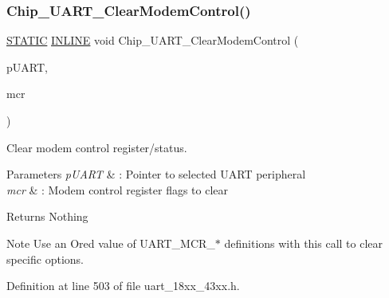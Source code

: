 \subsubsection{\texorpdfstring{Chip\+\_\+\+U\+A\+R\+T\+\_\+\+Clear\+Modem\+Control()}{Chip\_UART\_ClearModemControl()}}
{\footnotesize\ttfamily \hyperlink{group___l_p_c___types___public___macros_ga10b2d890d871e1489bb02b7e70d9bdfb}{S\+T\+A\+T\+IC} \hyperlink{spifi__18xx__43xx_8h_a2eb6f9e0395b47b8d5e3eeae4fe0c116}{I\+N\+L\+I\+NE} void Chip\+\_\+\+U\+A\+R\+T\+\_\+\+Clear\+Modem\+Control (\begin{DoxyParamCaption}\item[{\hyperlink{struct_l_p_c___u_s_a_r_t___t}{L\+P\+C\+\_\+\+U\+S\+A\+R\+T\+\_\+T} $\ast$}]{p\+U\+A\+RT,  }\item[{uint32\+\_\+t}]{mcr }\end{DoxyParamCaption})}



Clear modem control register/status. 


\begin{DoxyParams}{Parameters}
{\em p\+U\+A\+RT} & \+: Pointer to selected U\+A\+RT peripheral \\
\hline
{\em mcr} & \+: Modem control register flags to clear \\
\hline
\end{DoxyParams}
\begin{DoxyReturn}{Returns}
Nothing 
\end{DoxyReturn}
\begin{DoxyNote}{Note}
Use an Or\textquotesingle{}ed value of U\+A\+R\+T\+\_\+\+M\+C\+R\+\_\+$\ast$ definitions with this call to clear specific options. 
\end{DoxyNote}


Definition at line 503 of file uart\+\_\+18xx\+\_\+43xx.\+h.

\mbox{\label{group___u_a_r_t__18_x_x__43_x_x_ga27379f3351109d53453dfe4833e3f350}} 

